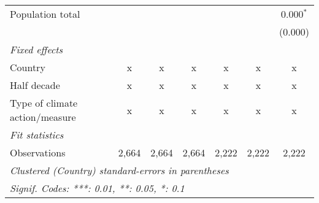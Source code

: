\begin{tabular}{lcccccc}
   Population total                           &         &               &               &               &               & 0.000$^{*}$\\   
                                              &         &               &               &               &               & (0.000)\\   
   \emph{Fixed effects}\\
   Country                                    & x       & x             & x             & x             & x             & x\\  
   Half decade                                & x       & x             & x             & x             & x             & x\\  
   Type of climate action/measure             & x       & x             & x             & x             & x             & x\\  
   \midrule \emph{Fit statistics}\\
   Observations                               & 2,664   & 2,664         & 2,664         & 2,222         & 2,222         & 2,222\\  
   \midrule
   \multicolumn{7}{l}{\emph{Clustered (Country) standard-errors in parentheses}}\\
   \multicolumn{7}{l}{\emph{Signif. Codes: ***: 0.01, **: 0.05, *: 0.1}}\\
\end{tabular}
\par\endgroup


